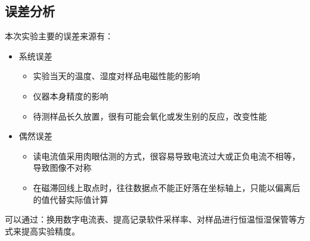 \documentclass[a4paper,utf8]{article}
\begin{document}
    \subsection{误差分析}
        本次实验主要的误差来源有：
        \begin{itemize}
            \item 系统误差
                \begin{itemize}
                    \item 实验当天的温度、湿度对样品电磁性能的影响
                    \item 仪器本身精度的影响
                    \item 待测样品长久放置，很有可能会氧化或发生别的反应，改变性能
                \end{itemize}
            \item 偶然误差
                \begin{itemize}
                    \item 读电流值采用肉眼估测的方式，很容易导致电流过大或正负电流不相等，导致图像不对称
                    \item 在磁滞回线上取点时，往往数据点不能正好落在坐标轴上，只能以偏离后的值代替实际值计算
                \end{itemize}
        \end{itemize}
        可以通过：换用数字电流表、提高记录软件采样率、对样品进行恒温恒湿保管等方式来提高实验精度。
\end{document}

